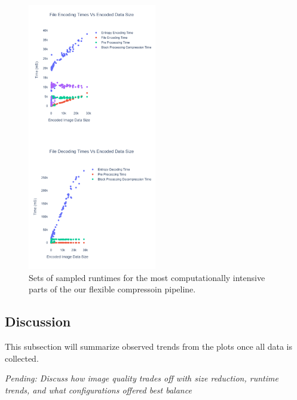 \begin{figure}
    \includegraphics[width=0.5\textwidth]{assets/Runtimes Summary.png}
    \caption{Sets of sampled runtimes for the most computationally intensive parts of the our flexible compressoin pipeline.}
    \label{fig:runtimes}
\end{figure}

\subsection{Discussion}
This subsection will summarize observed trends from the plots once all data is collected.

\textit{Pending: Discuss how image quality trades off with size reduction, runtime trends, and what configurations offered best balance}